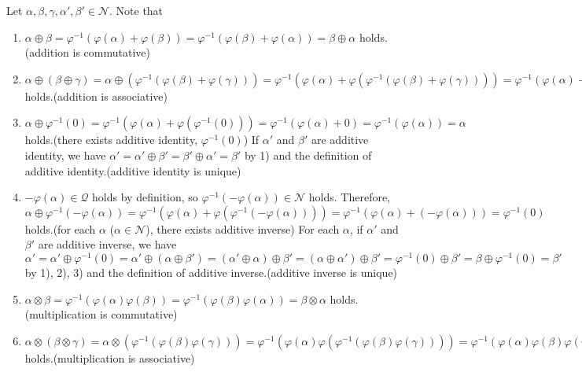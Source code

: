 \documentclass{article}
\theoremstyle{thmstyleone}
\theoremstyle{thmstyletwo}
\theoremstyle{thmstylethree}
\newcommand\N{\mathcal N}
\newcommand\Q{\mathcal Q}
\begin{document}
\begin{enumerate}[label = (\alph*)]
    Let $\alpha,\beta,\gamma,\alpha',\beta'\in\N$.
    Note that
    \begin{enumerate}[label = \arabic*)]
      \item $\alpha \oplus \beta = \varphi^{-1} (\varphi(\alpha) + \varphi(\beta)) = \varphi^{-1} (\varphi(\beta) + \varphi(\alpha)) = \beta \oplus \alpha$ holds.(addition is commutative)\\
      \item $\alpha \oplus (\beta \oplus \gamma) = \alpha \oplus (\varphi^{-1}(\varphi(\beta) + \varphi(\gamma))) = \varphi^{-1}(\varphi(\alpha) + \varphi(\varphi^{-1}(\varphi(\beta) + \varphi(\gamma))))  = \varphi^{-1}(\varphi(\alpha) + (\varphi(\beta) + \varphi(\gamma))) = \varphi^{-1}((\varphi(\alpha) + \varphi(\beta)) + \varphi(\gamma)) = \varphi^{-1}(\varphi(\varphi^{-1}(\varphi(\alpha) + \varphi(\beta))) + \varphi(\gamma)) = \varphi^{-1}(\varphi(\alpha) + \varphi(\beta)) \oplus \gamma = (\alpha \oplus \beta) \oplus \gamma$ holds.(addition is associative)
      \item $\alpha \oplus \varphi^{-1}(0) = \varphi^{-1}(\varphi(\alpha) + \varphi(\varphi^{-1}(0))) = \varphi^{-1}(\varphi(\alpha) + 0) = \varphi^{-1}(\varphi(\alpha)) = \alpha$ holds.(there exists additive identity, $\varphi^{-1}(0)$)
        If $\alpha'$ and $\beta'$ are additive identity, we have $\alpha' = \alpha' \oplus \beta' = \beta' \oplus \alpha' = \beta'$ by 1) and the definition of additive identity.(additive identity is unique)
      \item $-\varphi(\alpha)\in\Q$ holds by definition, so $\varphi^{-1}(-\varphi(\alpha)) \in \N$ holds. 
       Therefore, $\alpha \oplus \varphi^{-1}(-\varphi(\alpha)) = \varphi^{-1}(\varphi(\alpha) + \varphi(\varphi^{-1}(-\varphi(\alpha)))) = \varphi^{-1}(\varphi(\alpha) +  (-\varphi(\alpha))) = \varphi^{-1}(0)$ holds.(for each $\alpha$ ($\alpha\in\N$), there exists additive inverse)
        For each $\alpha$, if $\alpha'$ and $\beta'$ are additive inverse, we have $\alpha' = \alpha' \oplus \varphi^{-1}(0) = \alpha' \oplus (\alpha \oplus \beta') = (\alpha' \oplus \alpha) \oplus \beta' = (\alpha \oplus \alpha') \oplus \beta' = \varphi^{-1}(0) \oplus \beta' = \beta \oplus \varphi^{-1}(0) = \beta'$ by 1), 2), 3) and the definition of additive inverse.(additive inverse is unique)
      \item $\alpha \otimes \beta = \varphi^{-1}(\varphi(\alpha)\varphi(\beta)) = \varphi^{-1}(\varphi(\beta)\varphi(\alpha)) = \beta \otimes \alpha$ holds.(multiplication is commutative)
      \item $\alpha \otimes (\beta \otimes \gamma) = \alpha \otimes (\varphi^{-1}(\varphi(\beta)\varphi(\gamma))) = \varphi^{-1}(\varphi(\alpha)\varphi(\varphi^{-1}(\varphi(\beta)\varphi(\gamma)))) = \varphi^{-1}(\varphi(\alpha)\varphi(\beta)\varphi(\gamma)) = \varphi^{-1}(\varphi(\varphi^{-1}(\varphi(\alpha)\varphi(\beta)))\varphi(\gamma)) = \varphi^{-1}(\varphi(\alpha)\varphi(\beta)) \otimes \gamma = (\alpha \otimes \beta) \otimes \gamma$ holds.(multiplication is associative)

\end{enumerate}
\end{enumerate}
\end{document}
